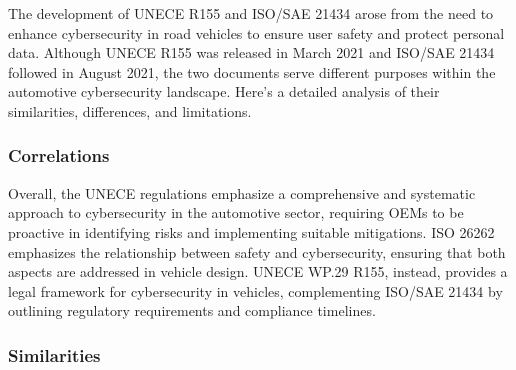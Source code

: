 The development of UNECE R155 and ISO/SAE 21434 arose from the need to enhance cybersecurity in road vehicles to ensure user safety and protect personal data.
Although UNECE R155 was released in March 2021 and ISO/SAE 21434 followed in August 2021, the two documents serve different purposes within the automotive cybersecurity landscape.
Here’s a detailed analysis of their similarities, differences, and limitations.

\subsubsection{Correlations}\label{subsubsec:correlations}

Overall, the UNECE regulations emphasize a comprehensive and systematic approach to cybersecurity in the automotive sector, requiring OEMs to be proactive in identifying risks and implementing suitable mitigations.
ISO 26262 emphasizes the relationship between safety and cybersecurity, ensuring that both aspects are addressed in vehicle design.
UNECE WP.29 R155, instead, provides a legal framework for cybersecurity in vehicles, complementing ISO/SAE 21434 by outlining regulatory requirements and compliance timelines.

\subsubsection{Similarities}

